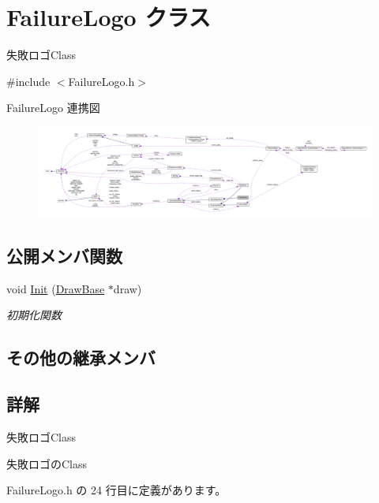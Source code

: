 \hypertarget{class_failure_logo}{}\section{Failure\+Logo クラス}
\label{class_failure_logo}


失敗ロゴ\+Class  




{\ttfamily \#include $<$Failure\+Logo.\+h$>$}



Failure\+Logo 連携図\nopagebreak
\begin{figure}[H]
\begin{center}
\leavevmode
\includegraphics[width=350pt]{class_failure_logo__coll__graph}
\end{center}
\end{figure}
\subsection*{公開メンバ関数}
\begin{DoxyCompactItemize}
\item 
void \mbox{\hyperlink{class_failure_logo_a22da89def55023f43860cf646da7a74c}{Init}} (\mbox{\hyperlink{class_draw_base}{Draw\+Base}} $\ast$draw)
\begin{DoxyCompactList}\small\item\em 初期化関数 \end{DoxyCompactList}\end{DoxyCompactItemize}
\subsection*{その他の継承メンバ}


\subsection{詳解}
失敗ロゴ\+Class 

失敗ロゴの\+Class 

 Failure\+Logo.\+h の 24 行目に定義があります。




